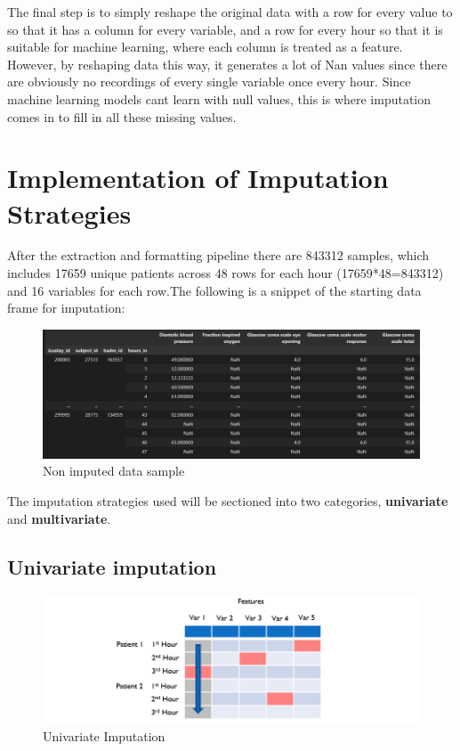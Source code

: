 \documentclass{l4proj}
\begin{document}
The final step is to simply reshape the original data with a row for every value to so that it has a column for every variable, and a row for every hour so that it is suitable for machine learning, where each column is treated as a feature. However, by reshaping data this way, it generates a lot of Nan values since there are obviously no recordings of every single variable once every hour. Since machine learning models cant learn with null values, this is where imputation comes in to fill in all these missing values. 

\chapter{Implementation of Imputation Strategies}

After the extraction and formatting pipeline there are 843312 samples, which includes 17659 unique patients across 48 rows for each hour (17659*48=843312) and 16 variables for each row.The following is a snippet of the starting data frame for imputation:

\begin{figure}[h!]
  \caption{Non imputed data sample}
  \includegraphics[width=\textwidth]{dissertation/Latex/images/Imputation Figures/non_imputed_data_sample.PNG}
\end{figure}


The imputation strategies used will be sectioned into two categories, \textbf{univariate} and \textbf{multivariate}.  

\section{Univariate imputation}


\begin{figure}[h!]
  \caption{Univariate Imputation}
  \includegraphics[width=\textwidth]{dissertation/Latex/images/Imputation Figures/univariate.PNG}
\end{figure}
\end{document}
